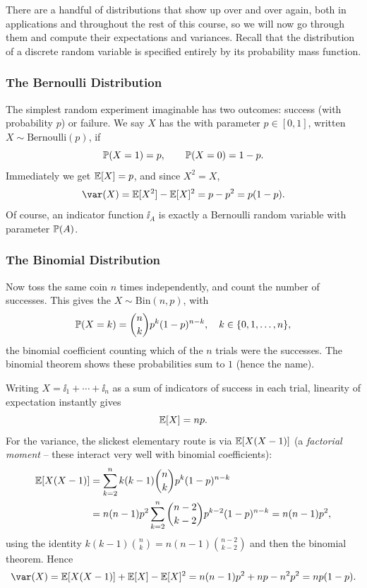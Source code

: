 \documentclass[a4paper]{scrartcl}
\begin{document}
There are a handful of distributions that show up over and over again, both in applications and throughout the rest of this course, so we will now go through them and compute their expectations and variances. Recall that the distribution of a discrete random variable is specified entirely by its probability mass function.

\subsubsection*{The Bernoulli Distribution}

The simplest random experiment imaginable has two outcomes: success (with probability $p$) or failure. We say $X$ has the  with parameter $p \in [0, 1]$, written $X \sim \mathrm{Bernoulli}(p)$, if
$$
\mathbb{P}(X = 1) = p, \qquad \mathbb{P}(X = 0) = 1 - p.
$$
Immediately we get $\mathbb{E}[X] = p$, and since $X^2 = X$,
$$
\var(X) = \EE[X^2] - \EE[X]^2 = p - p^2 = p(1-p).
$$
Of course, an indicator function $\ii_A$ is exactly a Bernoulli random variable with parameter $\mathbb{P}(A)$.

\subsubsection*{The Binomial Distribution}

Now toss the same coin $n$ times independently, and count the number of successes. This gives the  $X \sim \mathrm{Bin}(n, p)$, with
$$
\mathbb{P}(X = k) = \binom{n}{k} p^k (1 - p)^{n - k}, \quad k \in \{0, 1, \dots, n\},
$$
the binomial coefficient counting which of the $n$ trials were the successes. The binomial theorem shows these probabilities sum to $1$ (hence the name).

Writing $X = \ii_1 + \cdots + \ii_n$ as a sum of indicators of success in each trial, linearity of expectation instantly gives
$$
\mathbb{E}[X] = np.
$$
For the variance, the slickest elementary route is via $\mathbb{E}[X(X-1)]$ (a \emph{factorial moment} -- these interact very well with binomial coefficients):
\begin{align*}
	\mathbb{E}[X(X - 1)] &= \sum_{k = 2}^{n} k(k-1)\binom{n}{k}p^k (1-p)^{n - k} \\
	&= n(n-1)p^2 \sum_{k = 2}^{n} \binom{n - 2}{k - 2} p^{k - 2}(1 - p)^{n - k} = n(n - 1)p^2,
\end{align*}
using the identity $k(k-1)\binom{n}{k} = n(n-1)\binom{n-2}{k-2}$ and then the binomial theorem. Hence
$$
\var(X) = \EE[X(X-1)] + \EE[X] - \EE[X]^2 = n(n-1)p^2 + np - n^2p^2 = np(1 - p).
$$
\end{document}

